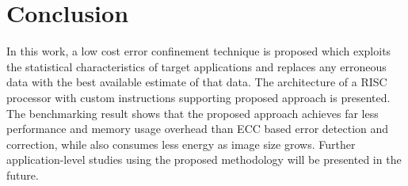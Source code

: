 \section{Conclusion} \label{sec:conclusion}
In this work, a low cost error confinement technique is proposed which exploits the statistical characteristics of target applications and replaces any erroneous data with the best available estimate of that data. The architecture of a RISC processor with custom instructions supporting proposed approach is presented. The benchmarking result shows that the proposed approach achieves far less performance and memory usage overhead than ECC based error detection and correction, while also consumes less energy as image size grows. Further application-level studies using the proposed methodology will be presented in the future.

